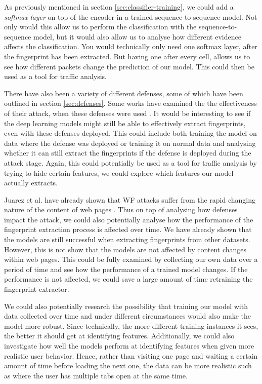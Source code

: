 As previously mentioned in section \ref{sec:classifier-training}, we could add a \textit{softmax layer} on top of the encoder in a trained sequence-to-sequence model.
Not only would this allow us to perform the classification with the sequence-to-sequence model, but it would also allow us to analyse how different evidence affects the classification.
You would technically only need one softmax layer, after the fingerprint has been extracted.
But having one after every cell, allows us to see how different packets change the prediction of our model.
This could then be used as a tool for traffic analysis.

There have also been a variety of different defenses, some of which have been outlined in section \ref{sec:defenses}.
Some works have examined the the effectiveness of their attack, when these defenses were used \cite{kfingerprinting,wang_cai_johnson_nithyanand_goldberg_2014}.
It would be interesting to see if the deep learning models might still be able to effectively extract fingerprints, even with these defenses deployed.
This could include both training the model on data where the defense was deployed or training it on normal data and analysing whether it can still extract the fingerprints if the defense is deployed during the attack stage.
Again, this could potentially be used as a tool for traffic analysis by trying to hide certain features, we could explore which features our model actually extracts.

Juarez et al. have already shown that WF attacks suffer from the rapid changing nature of the content of web pages \cite{wfpevaluation}.
Thus on top of analysing how defenses impact the attack, we could also potentially analyse how the performance of the fingerprint extraction process is affected over time.
We have already shown that the models are still successful when extracting fingerprints from other datasets.
However, this is not show that the models are not affected by content changes within web pages.
This could be fully examined by collecting our own data over a period of time and see how the performance of a trained model changes.
If the performance is not affected, we could save a large amount of time retraining the fingerprint extractor.

\newpage

We could also potentially research the possibility that training our model with data collected over time and under different circumstances would also make the model more robust.
Since technically, the more different training instances it sees, the better it should get at identifying features.
Additionally, we could also investigate how well the models perform at identifying features when given more realistic user behavior.
Hence, rather than visiting one page and waiting a certain amount of time before loading the next one, the data can be more realistic such as where the user has multiple tabs open at the same time.

